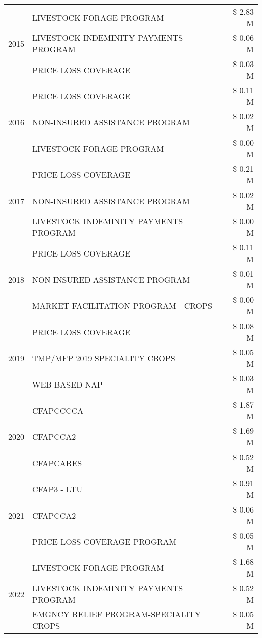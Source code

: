 \begin{tabular}{llr}
\cline{1-3}
\multirow[t]{3}{*}{2015} & LIVESTOCK FORAGE PROGRAM & \$ 2.83 M \\
 & LIVESTOCK INDEMINITY PAYMENTS PROGRAM & \$ 0.06 M \\
 & PRICE LOSS COVERAGE & \$ 0.03 M \\
\cline{1-3}
\multirow[t]{3}{*}{2016} & PRICE LOSS COVERAGE & \$ 0.11 M \\
 & NON-INSURED ASSISTANCE PROGRAM & \$ 0.02 M \\
 & LIVESTOCK FORAGE PROGRAM & \$ 0.00 M \\
\cline{1-3}
\multirow[t]{3}{*}{2017} & PRICE LOSS COVERAGE & \$ 0.21 M \\
 & NON-INSURED ASSISTANCE PROGRAM & \$ 0.02 M \\
 & LIVESTOCK INDEMINITY PAYMENTS PROGRAM & \$ 0.00 M \\
\cline{1-3}
\multirow[t]{3}{*}{2018} & PRICE LOSS COVERAGE & \$ 0.11 M \\
 & NON-INSURED ASSISTANCE PROGRAM & \$ 0.01 M \\
 & MARKET FACILITATION PROGRAM - CROPS & \$ 0.00 M \\
\cline{1-3}
\multirow[t]{3}{*}{2019} & PRICE LOSS COVERAGE & \$ 0.08 M \\
 & TMP/MFP 2019 SPECIALITY CROPS & \$ 0.05 M \\
 & WEB-BASED NAP & \$ 0.03 M \\
\cline{1-3}
\multirow[t]{3}{*}{2020} & CFAPCCCCA & \$ 1.87 M \\
 & CFAPCCA2 & \$ 1.69 M \\
 & CFAPCARES & \$ 0.52 M \\
\cline{1-3}
\multirow[t]{3}{*}{2021} & CFAP3 - LTU & \$ 0.91 M \\
 & CFAPCCA2 & \$ 0.06 M \\
 & PRICE LOSS COVERAGE PROGRAM & \$ 0.05 M \\
\cline{1-3}
\multirow[t]{3}{*}{2022} & LIVESTOCK FORAGE PROGRAM & \$ 1.68 M \\
 & LIVESTOCK INDEMINITY PAYMENTS PROGRAM & \$ 0.52 M \\
 & EMGNCY RELIEF PROGRAM-SPECIALITY CROPS & \$ 0.05 M \\
\cline{1-3}
\bottomrule
\end{tabular}
